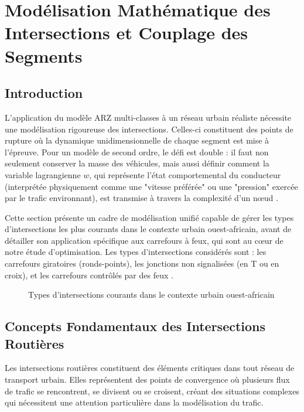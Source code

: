 \chapter{Modélisation Mathématique des Intersections et Couplage des Segments}
\label{chap:modeles_intersections}

\section{Introduction}
L'application du modèle ARZ multi-classes à un réseau urbain réaliste nécessite une modélisation rigoureuse des intersections. Celles-ci constituent des points de rupture où la dynamique unidimensionnelle de chaque segment est mise à l'épreuve. Pour un modèle de second ordre, le défi est double : il faut non seulement conserver la masse des véhicules, mais aussi définir comment la variable lagrangienne $ w $, qui représente l'état comportemental du conducteur (interprétée physiquement comme une "vitesse préférée" ou une "pression" exercée par le trafic environnant), est transmise à travers la complexité d'un nœud \cite{GaravelloPiccoli2006}.

Cette section présente un cadre de modélisation unifié capable de gérer les types d'intersections les plus courants dans le contexte urbain ouest-africain, avant de détailler son application spécifique aux carrefours à feux, qui sont au cœur de notre étude d'optimisation. Les types d'intersections considérés sont : les carrefours giratoires (ronds-points), les jonctions non signalisées (en T ou en croix), et les carrefours contrôlés par des feux \cite{LebacqueKhoshyaran2005}.

\begin{figure}[htbp]
\centering
\caption{Types d'intersections courants dans le contexte urbain ouest-africain}
\label{fig:types_intersections}
\end{figure}

\section{Concepts Fondamentaux des Intersections Routières}
Les intersections routières constituent des éléments critiques dans tout réseau de transport urbain. Elles représentent des points de convergence où plusieurs flux de trafic se rencontrent, se divisent ou se croisent, créant des situations complexes qui nécessitent une attention particulière dans la modélisation du trafic.

